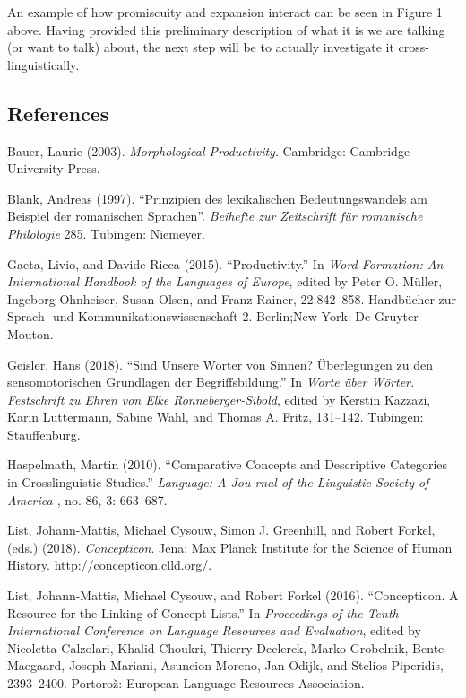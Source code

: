 \documentclass[
  a4paper,
  14pt,
  oneside,
  tablecaptionabove
]{scrbook}
\begin{document}
An example of how
promiscuity and expansion interact can be seen in Figure 1 above. Having
provided this preliminary description of what it is we are talking (or
want to talk) about, the next step will be to actually investigate it
cross-linguistically.

\pagebreak
\subsection*{References}

\nopagebreak\hangindent=0.7cm {\small Bauer, Laurie (2003). \emph{Morphological Productivity}.  Cambridge:
Cambridge University Press. }

\nopagebreak\hangindent=0.7cm {\small Blank, Andreas (1997). ``Prinzipien des lexikalischen
Bedeutungswandels am Beispiel der romanischen Sprachen''.  \emph{Beihefte zur
Zeitschrift für romanische Philologie} 285. Tübingen: Niemeyer. }

\nopagebreak\hangindent=0.7cm {\small Gaeta, Livio, and Davide Ricca (2015). \enquote{Productivity.} In
\emph{Word-Formation: An International Handbook of the Languages of
Europe}, edited by Peter O. Müller, Ingeborg Ohnheiser, Susan Olsen,
and Franz Rainer, 22:842--858. Handbücher zur Sprach- und
Kommunikationswissenschaft 2. Berlin;New York: De Gruyter Mouton. }

\nopagebreak\hangindent=0.7cm {\small Geisler, Hans (2018). \enquote{Sind Unsere Wörter von Sinnen?
Überlegungen zu den sensomotorischen Grundlagen der Begriffsbildung.} In
\emph{Worte über Wörter. Festschrift zu Ehren von Elke
Ronneberger-Sibold}, edited by Kerstin Kazzazi, Karin Luttermann,
Sabine Wahl, and Thomas A. Fritz, 131--142. Tübingen: Stauffenburg. }

\nopagebreak\hangindent=0.7cm {\small Haspelmath, Martin (2010). \enquote{Comparative Concepts and
Descriptive Categories in Crosslinguistic Studies.} \emph{Language: A
Jou { rnal of the Linguistic Society of America }}, no. 86, 3:
663--687. }

\nopagebreak\hangindent=0.7cm {\small List, Johann-Mattis, Michael Cysouw, Simon J. Greenhill, and Robert
Forkel, (eds.) (2018). \emph{Concepticon}.  Jena: Max Planck Institute for
the Science of Human History. \url{http://concepticon.clld.org/}.  }

\nopagebreak\hangindent=0.7cm {\small List, Johann-Mattis, Michael Cysouw, and Robert Forkel (2016).
\enquote{Concepticon. A Resource for the Linking of Concept Lists.} In
\emph{Proceedings of the Tenth International Conference on Language
Resources and Evaluation}, edited by Nicoletta Calzolari, Khalid
Choukri, Thierry Declerck, Marko Grobelnik, Bente Maegaard, Joseph
Mariani, Asuncion Moreno, Jan Odijk, and Stelios Piperidis, 2393--2400.
Portorož: European Language Resources Association. }
\end{document}
